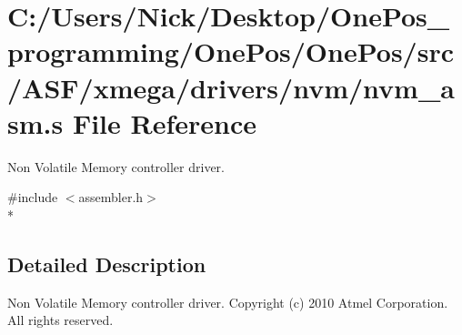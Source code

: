 \hypertarget{nvm__asm_8s}{\section{C\-:/\-Users/\-Nick/\-Desktop/\-One\-Pos\-\_\-programming/\-One\-Pos/\-One\-Pos/src/\-A\-S\-F/xmega/drivers/nvm/nvm\-\_\-asm.s File Reference}
\label{nvm__asm_8s}
}


Non Volatile Memory controller driver.  


{\ttfamily \#include $<$assembler.\-h$>$}\\*


\subsection{Detailed Description}
Non Volatile Memory controller driver. Copyright (c) 2010 Atmel Corporation. All rights reserved.